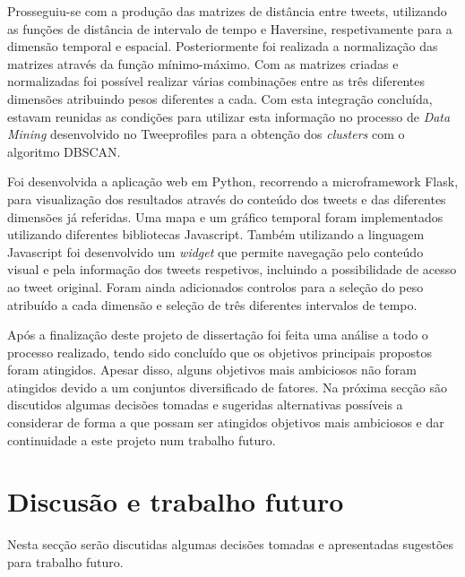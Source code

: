 Prosseguiu-se com a produção das matrizes de distância entre tweets, utilizando as funções de distância de intervalo de tempo e Haversine, respetivamente para a dimensão temporal e espacial. Posteriormente foi realizada a normalização das matrizes através da função mínimo-máximo. Com as matrizes criadas e normalizadas foi possível realizar várias combinações entre as três diferentes dimensões atribuindo pesos diferentes a cada. Com esta integração concluída, estavam reunidas as condições para utilizar esta informação no processo de \textit{Data Mining} desenvolvido no Tweeprofiles para a obtenção dos \textit{clusters} com o algoritmo DBSCAN.

Foi desenvolvida a aplicação web em Python, recorrendo a microframework Flask, para visualização dos resultados através do conteúdo dos tweets e das diferentes dimensões já referidas. Uma mapa e um gráfico temporal foram implementados utilizando diferentes bibliotecas Javascript. Também utilizando a linguagem Javascript foi desenvolvido um \textit{widget} que permite navegação pelo conteúdo visual e pela informação dos tweets respetivos, incluindo a possibilidade de acesso ao tweet original. Foram ainda adicionados controlos para a seleção do peso atribuído a cada dimensão e seleção de três diferentes intervalos de tempo.

Após a finalização deste projeto de dissertação foi feita uma análise a todo o processo realizado, tendo sido concluído que os objetivos principais propostos foram atingidos. Apesar disso, alguns objetivos mais ambiciosos não foram atingidos devido a um conjuntos diversificado de fatores. Na próxima secção são discutidos algumas decisões tomadas e sugeridas alternativas possíveis a considerar de forma a que possam ser atingidos objetivos mais ambiciosos e dar continuidade a este projeto num trabalho futuro.

\section{Discusão e trabalho futuro}

Nesta secção serão discutidas algumas decisões tomadas e apresentadas sugestões para trabalho futuro.

